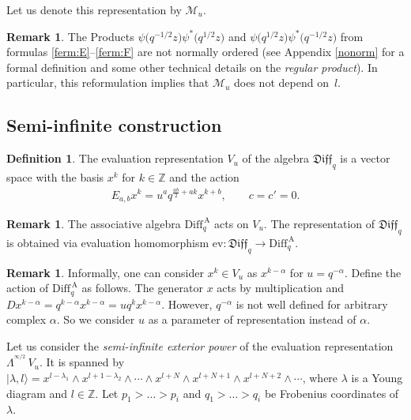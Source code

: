 \documentclass[pdftex]{sigma}
\numberwithin{equation}{section}
\theoremstyle{definition}
\newtheorem{Remark}[Theorem]{Remark}
\newtheorem{Definition}[Theorem]{Definition}
\newcommand{\qaD}{\mathrm{Diff}_q^{\, \mathrm{A}}}
\newcommand{\qD}{\mathfrak{Diff}_q}
\newcommand{\siL}{ \Lambda^{^{\! \infty/2}} \,}
\begin{document}
Let us denote this representation by $\mathcal{M}_u$.

\begin{Remark}The Products $\psi\big( q^{-1/2} z\big) \psi^* \big( q^{1/2} z\big)$ and $\psi\big( q^{1/2} z\big) \psi^* \big(q^{-1/2} z\big)$ from formulas \eqref{ferm:E}--\eqref{ferm:F} are not normally ordered (see Appendix \ref{nonorm} for a formal definition and some other technical details on the \emph{regular product}). In particular, this reformulation implies that $\mathcal{M}_u$ does not depend on~$l$.
\end{Remark}

\subsection{Semi-infinite construction}

\begin{Definition} \label{eq: sec3 eval def}The evaluation representation $V_{u}$ of the algebra $\qD$ is a vector space with the basis $x^{k}$ for $k \in \mathbb{Z}$ and the action
\begin{gather*}
E_{a,b} x^{k} = u^a q^{\frac{ab}{2} + ak} x^{k+b}, \qquad c=c'=0.
\end{gather*}
\end{Definition}

\begin{Remark}The associative algebra $\qaD$ acts on $V_u$. The representation of $\qD$ is obtained via evaluation homomorphism $\mathrm{ev}\colon \qD \rightarrow \qaD$.
\end{Remark}

\begin{Remark}Informally, one can consider $x^k \in V_u$ as $x^{k-\alpha}$ for $u=q^{-\alpha}$. Define the action of $\qaD$ as follows. The generator $x$ acts by multiplication and $D x^{k-\alpha} = q^{k-\alpha} x^{k-\alpha} = u q^k x^{k-\alpha}$. However, $q^{-\alpha}$ is not well defined for arbitrary complex $\alpha$. So we consider $u$ as a parameter of representation instead of $\alpha$.
\end{Remark}

Let us consider the \emph{semi-infinite exterior power} of the evaluation representation $\siL V_{u}$. It is spanned by $| \lambda,l \rangle = x^{l-\lambda_1} \wedge x^{l+1-\lambda_2} \wedge \cdots \wedge x^{l+N} \wedge x^{l+N+1} \wedge x^{l+N+2} \wedge \cdots$, where $\lambda$ is a Young diagram and $l \in \mathbb{Z}$. Let $p_1 > \dots> p_i$ and $q_1> \dots> q_i$ be Frobenius coordinates of $\lambda$.
\end{document}
